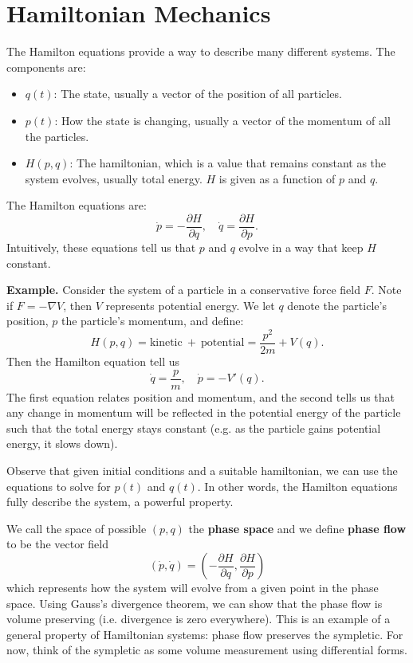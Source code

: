 \section{Hamiltonian Mechanics}
The Hamilton equations provide a way to describe many different systems. The components are:
\begin{itemize}
    \item $q(t)$: The state, usually a vector of the position of all particles.
    \item $p(t)$: How the state is changing, usually a vector of the momentum of all the particles.
    \item $H(p, q)$: The hamiltonian, which is a value that remains constant as the system evolves, usually total energy. $H$ is given as a function of $p$ and $q$.
\end{itemize}
The Hamilton equations are:
\[
    \dot{p} = - \frac{\partial H}{\partial q}, \quad \dot{q} = \frac{\partial H}{\partial p}.
\]
Intuitively, these equations tell us that $p$ and $q$ evolve in a way that keep $H$ constant.

\hsep

\noindent
\textbf{Example.} Consider the system of a particle in a conservative force field $F$. Note if $F = -\nabla V$, then $V$ represents potential energy. We let $q$ denote the particle's position, $p$ the particle's momentum, and define:
\[
    H(p, q) = \text{kinetic} \ + \ \text{potential} = \frac{p^2}{2m} + V(q).
\]
Then the Hamilton equation tell us
\[
    \dot{q} = \frac{p}{m}, \quad \dot{p} = - V'(q).
\]
The first equation relates position and momentum, and the second tells us that any change in momentum will be reflected in the potential energy of the particle such that the total energy stays constant (e.g. as the particle gains potential energy, it slows down).

\hsep

Observe that given initial conditions and a suitable hamiltonian, we can use the equations to solve for $p(t)$ and $q(t)$. In other words, the Hamilton equations fully describe the system, a powerful property.

We call the space of possible $(p, q)$ the \textbf{phase space} and we define \textbf{phase flow} to be the vector field
\[
    (\dot{p}, \dot{q}) = \left( - \frac{\partial H}{\partial q}, \frac{\partial H}{\partial p}\right)
\]
which represents how the system will evolve from a given point in the phase space. Using Gauss's divergence theorem, we can show that the phase flow is volume preserving (i.e. divergence is zero everywhere). This is an example of a general property of Hamiltonian systems: phase flow preserves the sympletic. For now, think of the sympletic as some volume measurement using differential forms.
